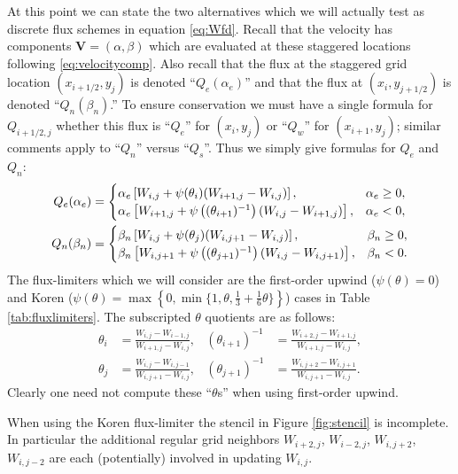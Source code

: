 \documentclass[11pt,final]{amsart}%
\newcommand\bV{\mathbf{V}}
\begin{document}
At this point we can state the two alternatives which we will actually test as discrete flux schemes in equation \eqref{eq:Wfd}.  Recall that the velocity has components $\bV=(\alpha,\beta)$ which are evaluated at these staggered locations following \eqref{eq:velocitycomp}.  Also recall that the flux at the staggered grid location $(x_{i+1/2},y_j)$ is denoted ``$Q_e(\alpha_e)$'' and that the flux at $(x_i,y_{j+1/2})$ is denoted ``$Q_n(\beta_n)$.''  To ensure conservation we must have a single formula for $Q_{i+1/2,j}$ whether this flux is ``$Q_e$'' for $(x_i,y_j)$ or ``$Q_w$'' for $(x_{i+1},y_j)$; similar comments apply to ``$Q_n$'' versus ``$Q_s$''.  Thus we simply give formulas for $Q_e$ and $Q_n$:
\begin{align}
Q_e(\alpha_e) &= \begin{cases} \alpha_e \left[W_{i,j} + \psi(\theta_{i}) (W_{i+1,j} - W_{i,j})\right], & \alpha_e \ge 0, \\ \alpha_e \left[W_{i+1,j} + \psi\left((\theta_{i+1})^{-1}\right) (W_{i,j} - W_{i+1,j})\right], & \alpha_e < 0, \end{cases} \label{eq:adfluxes} \\
Q_n(\beta_n) &= \begin{cases} \beta_n \left[W_{i,j} + \psi(\theta_{j}) (W_{i,j+1} - W_{i,j})\right], & \beta_n \ge 0, \\ \beta_n \left[W_{i,j+1} + \psi\left((\theta_{j+1})^{-1}\right) (W_{i,j} - W_{i,j+1})\right], & \beta_n < 0. \end{cases} \notag
\end{align}
The flux-limiters which we will consider are the first-order upwind ($\psi(\theta)=0$) and Koren ($\psi(\theta) = \max\left\{0,\min\{1,\theta,\frac{1}{3}+\frac{1}{6} \theta\}\right\}$) cases in Table \ref{tab:fluxlimiters}.  The subscripted $\theta$ quotients are as follows:
\begin{align*}
\theta_i &= \frac{W_{i,j}-W_{i-1,j}}{W_{i+1,j} - W_{i,j}}, & (\theta_{i+1})^{-1} &= \frac{W_{i+2,j}-W_{i+1,j}}{W_{i+1,j} - W_{i,j}}, \\
\theta_j &= \frac{W_{i,j}-W_{i,j-1}}{W_{i,j+1} - W_{i,j}}, & (\theta_{j+1})^{-1} &= \frac{W_{i,j+2}-W_{i,j+1}}{W_{i,j+1} - W_{i,j}}.
\end{align*}
Clearly one need not compute these ``$\theta$s'' when using first-order upwind.

When using the Koren flux-limiter the stencil in Figure \ref{fig:stencil} is incomplete.  In particular the additional regular grid neighbors $W_{i+2,j}$, $W_{i-2,j}$, $W_{i,j+2}$, $W_{i,j-2}$ are each (potentially) involved in updating $W_{i,j}$.
\end{document}
